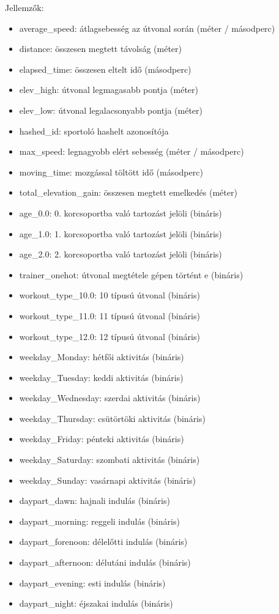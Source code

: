 Jellemzők:
\begin{itemize}
	\item average\_speed: átlagsebesség az útvonal során (méter / másodperc)
	\item distance: összesen megtett távolság (méter)
	\item elapsed\_time: összesen eltelt idő (másodperc)
	\item elev\_high: útvonal legmagasabb pontja (méter)
	\item elev\_low: útvonal legalacsonyabb pontja (méter)
	\item hashed\_id: sportoló hashelt azonosítója
	\item max\_speed: legnagyobb elért sebesség (méter / másodperc)
	\item moving\_time: mozgással töltött idő (másodperc)
	\item total\_elevation\_gain: összesen megtett emelkedés (méter)
	\item age\_0.0: 0. korcsoportba való tartozást jelöli (bináris)
	\item age\_1.0: 1. korcsoportba való tartozást jelöli (bináris)
	\item age\_2.0: 2. korcsoportba való tartozást jelöli (bináris)
	\item trainer\_onehot: útvonal megtétele gépen történt e (bináris)
	\item workout\_type\_10.0: 10 típusú útvonal (bináris)
	\item workout\_type\_11.0: 11 típusú útvonal (bináris)
	\item workout\_type\_12.0: 12 típusú útvonal (bináris)
	\item weekday\_Monday: hétfői aktivitás (bináris)
	\item weekday\_Tuesday: keddi aktivitás (bináris)
	\item weekday\_Wednesday: szerdai aktivitás (bináris)
	\item weekday\_Thursday: csütörtöki aktivitás (bináris)
	\item weekday\_Friday: pénteki aktivitás (bináris)
	\item weekday\_Saturday: szombati aktivitás (bináris)
	\item weekday\_Sunday: vasárnapi aktivitás (bináris)
	\item daypart\_dawn: hajnali indulás (bináris)
	\item daypart\_morning: reggeli indulás (bináris)
	\item daypart\_forenoon: délelőtti indulás (bináris)
	\item daypart\_afternoon: délutáni indulás (bináris)
	\item daypart\_evening: esti indulás (bináris)
	\item daypart\_night: éjszakai indulás (bináris)
\end{itemize}


